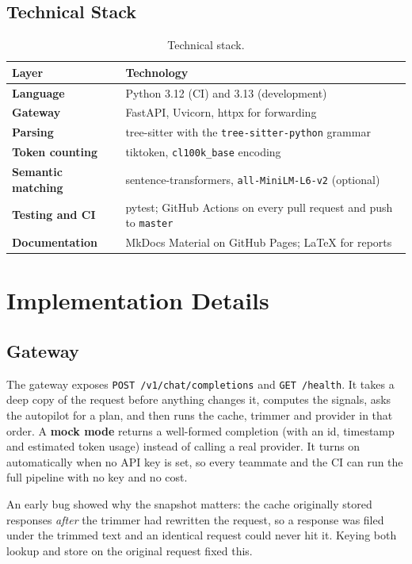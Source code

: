 \documentclass[12pt, a4paper, oneside]{report}
\newcommand{\code}[1]{\texttt{#1}}
\begin{document}


\subsection{Technical Stack}

\begin{table}[H]
\centering
\begin{tabularx}{\textwidth}{>{\bfseries}l X}
\toprule
Layer & Technology \\
\midrule
Language & Python 3.12 (CI) and 3.13 (development) \\
Gateway & FastAPI, Uvicorn, httpx for forwarding \\
Parsing & tree-sitter with the \code{tree-sitter-python} grammar \\
Token counting & tiktoken, \code{cl100k\_base} encoding \\
Semantic matching & sentence-transformers, \code{all-MiniLM-L6-v2} (optional) \\
Testing and CI & pytest; GitHub Actions on every pull request and push to \code{master} \\
Documentation & MkDocs Material on GitHub Pages; LaTeX for reports \\
\bottomrule
\end{tabularx}
\caption{Technical stack.}
\end{table}

\section{Implementation Details}

\subsection{Gateway}

The gateway exposes \code{POST /v1/chat/completions} and \code{GET /health}. It
takes a deep copy of the request before anything changes it, computes the signals,
asks the autopilot for a plan, and then runs the cache, trimmer and provider in
that order. A \textbf{mock mode} returns a well-formed completion (with an id,
timestamp and estimated token usage) instead of calling a real provider. It turns
on automatically when no API key is set, so every teammate and the CI can run the
full pipeline with no key and no cost.

An early bug showed why the snapshot matters: the cache originally stored
responses \emph{after} the trimmer had rewritten the request, so a response was
filed under the trimmed text and an identical request could never hit it. Keying
both lookup and store on the original request fixed this.
\end{document}
